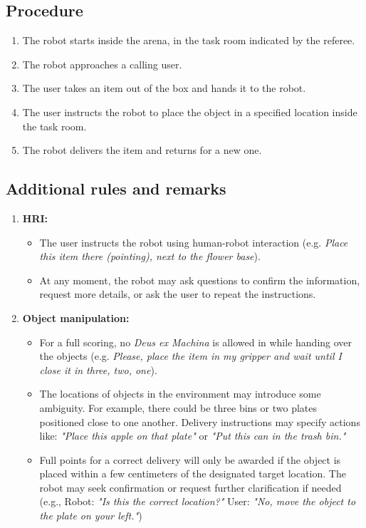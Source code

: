 \subsection*{Procedure}
	\begin{enumerate}[nosep]
		\item The robot starts inside the arena, in the task room indicated by the referee.
		\item The robot approaches a calling user.
		\item The user takes an item out of the box and hands it to the robot. 
		\item The user instructs the robot to place the object in a specified location inside the task room.
            \item The robot delivers the item and returns for a new one.
	\end{enumerate}


\subsection*{Additional rules and remarks}
\begin{enumerate}[nosep]
	\item \textbf{HRI:}
	\begin{itemize}[nosep]
            \item  The user instructs the robot using human-robot interaction (e.g. \textit{Place this item there (pointing), next to the flower base}).
		\item At any moment, the robot may ask questions to confirm the information, request more details, or ask the user to repeat the instructions.
	\end{itemize}
	\item \textbf{Object manipulation:} 
        \begin{itemize}[nosep]
            \item For a full scoring, no \textit{Deus ex Machina} is allowed in while handing over the objects (e.g. \textit{Please, place the item in my gripper and wait until I close it in three, two, one}). 
            \item The locations of objects in the environment may introduce some ambiguity. For example, there could be three bins or two plates positioned close to one another. Delivery instructions may specify actions like: \textit{"Place this apple on that plate"} or \textit{"Put this can in the trash bin."}
            \item Full points for a correct delivery will only be awarded if the object is placed within a few centimeters of the designated target location. The robot may seek confirmation or request further clarification if needed (e.g., Robot: \textit{"Is this the correct location?"} User: \textit{"No, move the object to the plate on your left."})
        \end{itemize}
\end{enumerate}

